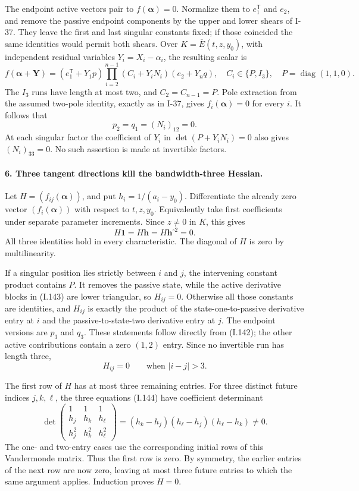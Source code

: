 The endpoint active vectors pair to $f(\boldsymbol\alpha)=0$.
Normalize them to $e_1^{\mathsf T}$ and $e_2$, and remove the
passive endpoint components by the upper and lower shears of
I-37. They leave the first and last singular constants fixed;
if those coincided the same identities would permit both
shears. Over $K=\overline E(t,z,y_0)$, with independent residual
variables $Y_i=X_i-\alpha_i$, the resulting scalar is
\[
 f(\boldsymbol\alpha+\mathbf Y)=
 (e_1^{\mathsf T}+Y_1p)
 \prod_{i=2}^{n-1}(C_i+Y_iN_i)
 (e_2+Y_nq),
 \quad C_i\in\{P,I_3\},\quad P=\operatorname{diag}(1,1,0).
 \tag{I.142}
\]
The $I_3$ runs have length at most two, and $C_2=C_{n-1}=P$.
Pole extraction from the assumed two-pole identity, exactly
as in I-37, gives $f_i(\boldsymbol\alpha)=0$ for every $i$.
It follows that
\[
 p_2=q_1=(N_i)_{12}=0.
 \tag{I.143}
\]
At each singular factor the coefficient of $Y_i$ in
$\det(P+Y_iN_i)=0$ also gives $(N_i)_{33}=0$.
No such assertion is made at invertible factors.

\paragraph{6. Three tangent directions kill the bandwidth-three Hessian.}
Let $H=(f_{ij}(\boldsymbol\alpha))$, and put
$h_i=1/(a_i-y_0)$. Differentiate the already zero vector
$(f_i(\boldsymbol\alpha))$ with respect to $t,z,y_0$.
Equivalently take first coefficients under separate parameter
increments. Since $z\ne0$ in $K$, this gives
\[
 H\mathbf1=H\mathbf h=H\mathbf h^{\circ2}=0.
 \tag{I.144}
\]
All three identities hold in every characteristic. The diagonal
of $H$ is zero by multilinearity.

If a singular position lies strictly between $i$ and $j$, the
intervening constant product contains $P$. It removes the
passive state, while the active derivative blocks in (I.143)
are lower triangular, so $H_{ij}=0$. Otherwise all those
constants are identities, and $H_{ij}$ is exactly the product
of the state-one-to-passive derivative entry at $i$ and the
passive-to-state-two derivative entry at $j$. The endpoint
versions are $p_3$ and $q_3$. These statements follow directly
from (I.142); the other active contributions contain a zero
$(1,2)$ entry. Since no invertible run has length three,
\[
 H_{ij}=0\qquad\text{when }|i-j|>3.
 \tag{I.145}
\]

The first row of $H$ has at most three remaining entries.
For three distinct future indices $j,k,\ell$, the three
equations (I.144) have coefficient determinant
\[
 \det\begin{pmatrix}
 1&1&1\\h_j&h_k&h_\ell\\h_j^2&h_k^2&h_\ell^2
 \end{pmatrix}
 =(h_k-h_j)(h_\ell-h_j)(h_\ell-h_k)\ne0.
 \tag{I.146}
\]
The one- and two-entry cases use the corresponding initial
rows of this Vandermonde matrix. Thus the first row is zero.
By symmetry, the earlier entries of the next row are now zero,
leaving at most three future entries to which the same argument
applies. Induction proves $H=0$.

